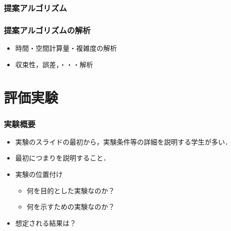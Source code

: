 \documentclass[dvipdfmx,cjk,t,10pt]{beamer}
\begin{document}
\begin{frame}
\frametitle{提案アルゴリズム}

\begin{center}

\end{center}

\end{frame}


\begin{frame}
\frametitle{提案アルゴリズムの解析}
	\begin{itemize}
	\item 時間・空間計算量・複雑度の解析
	\item 収束性，誤差，・・・解析
	\end{itemize}		
\end{frame}

\section{評価実験}

\begin{frame}
\frametitle{実験概要}

	\begin{screen}
		\begin{itemize}
		\item 実験のスライドの最初から，実験条件等の詳細を説明する学生が多い．
		\item 最初につまりを説明すること．
		\end{itemize}			
	\end{screen}
	
	\begin{itemize}
	\item 実験の位置付け
		\begin{itemize}
		\item 何を目的とした実験なのか？
		\item 何を示すための実験なのか？
		\end{itemize}	
	\item 想定される結果は？			
	\end{itemize}		
\end{frame}
\end{document}
